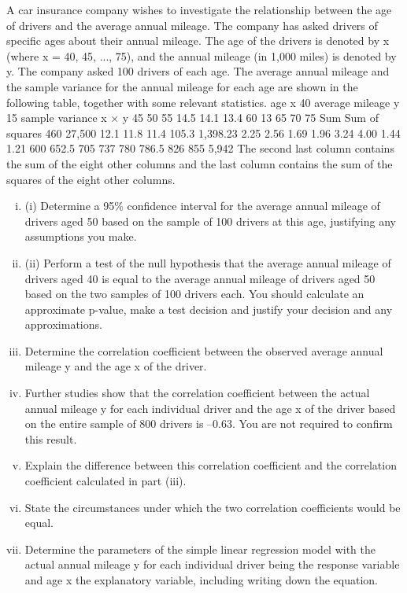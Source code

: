 \documentclass[a4paper,12pt]{article}
\begin{document}

A car insurance company wishes to investigate the relationship between the age of drivers and the average annual mileage. The company has asked drivers of specific ages about their annual mileage. The age of the drivers is denoted by x (where x = 40,
45, ..., 75), and the annual mileage (in 1,000 miles) is denoted by y. The company asked 100 drivers of each age.
The average annual mileage and the sample variance for the annual mileage for each age are shown in the following table, together with some relevant statistics.
age x 40
average mileage y 15
sample variance
x × y
45
50
55
14.5 14.1 13.4
60
13
65
70
75
Sum Sum of squares
460 27,500
12.1 11.8 11.4 105.3
1,398.23
2.25 2.56 1.69 1.96 3.24 4.00 1.44 1.21
600 652.5 705
737
780 786.5 826
855 5,942
The second last column contains the sum of the eight other columns and the last
column contains the sum of the squares of the eight other columns.

\begin{enumerate}[(i)]
\item (i) Determine a 95\%  confidence interval for the average annual mileage of
drivers aged 50 based on the sample of 100 drivers at this age, justifying any
assumptions you make.


\item (ii) Perform a test of the null hypothesis that the average annual mileage of drivers aged 40 is equal to the average annual mileage of drivers aged 50 based on the two samples of 100 drivers each. You should calculate an approximate
p-value, make a test decision and justify your decision and any
approximations.
\item 
Determine the correlation coefficient between the observed average annual
mileage y and the age x of the driver.
\item 

Further studies show that the correlation coefficient between the actual annual mileage
y for each individual driver and the age x of the driver based on the entire sample of 800 drivers is –0.63. You are not required to confirm this result.
\item 
Explain the difference between this correlation coefficient and the correlation coefficient calculated in part (iii). 
\item 

State the circumstances under which the two correlation coefficients would be equal.
\item 
Determine the parameters of the simple linear regression model with the actual annual mileage y for each individual driver being the response variable and age x the explanatory variable, including writing down the equation. 
\end{enumerate}
\end{document}
